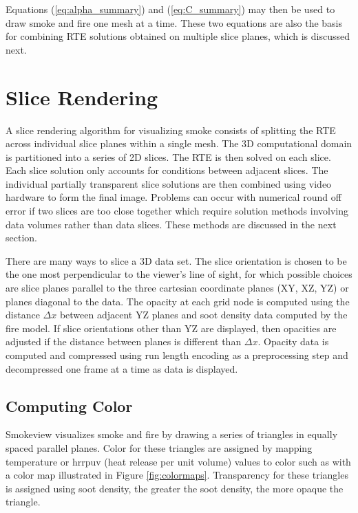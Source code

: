 {Equations (\ref{eq:alpha_summary}) and (\ref{eq:C_summary}) may
then be used to draw smoke and fire one mesh at a time.  These two
equations are also the basis for combining RTE solutions obtained
on multiple slice planes, which is discussed next.


\section{Slice Rendering}
A slice rendering algorithm for visualizing smoke consists of
splitting the RTE across individual slice planes within a single
mesh.  The 3D computational domain is partitioned into a series of
2D slices.  The RTE is then solved on each slice.  Each slice
solution only accounts for conditions between adjacent slices.
The individual partially transparent slice solutions are then
combined using video hardware to form the final image.   Problems
can occur with numerical round off error if two slices are too
close together which require solution methods  involving data
volumes rather than data slices. These methods are discussed in
the next section.

There are many ways to slice a 3D data set.  The slice orientation
is chosen to be the one most perpendicular to the viewer's line of
sight, for which possible choices are slice planes parallel to the
three cartesian coordinate planes (XY, XZ, YZ) or planes diagonal
to the data.  The opacity at each grid node is computed using the
distance $\Delta x$ between adjacent YZ planes and soot density
data computed by the fire model.  If slice orientations other than
YZ are displayed, then opacities are adjusted if the distance
between planes is different than $\Delta x$.  Opacity data is
computed and compressed using run length encoding as a
preprocessing step and decompressed one frame at a time as data is
displayed.


\subsection{Computing Color}

Smokeview visualizes smoke and fire by drawing a series of triangles in equally spaced parallel planes.
Color for these triangles are assigned by mapping temperature or hrrpuv (heat release per unit volume) values
to color such as with a color map illustrated in Figure \ref{fig:colormaps}.
Transparency for these triangles is assigned using soot density, the greater the soot density, the more opaque the triangle.

}
